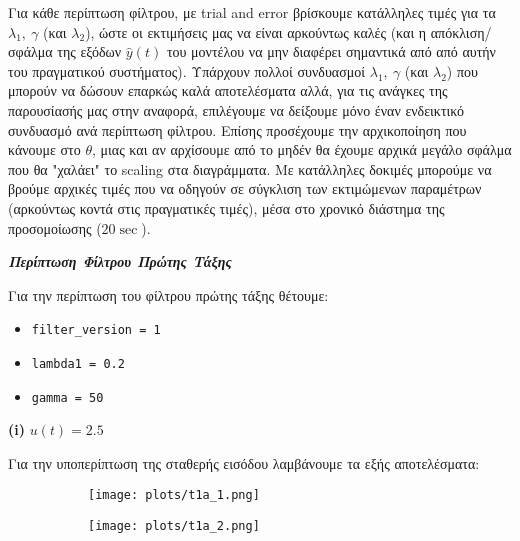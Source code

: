 \documentclass[12pt]{article} %
\numberwithin{equation}{section}  %
\begin{document}
Για κάθε περίπτωση φίλτρου, με trial and error βρίσκουμε κατάλληλες τιμές για τα $\lambda_1, \ \gamma$ (και $\lambda_2$), ώστε οι εκτιμήσεις μας να είναι αρκούντως καλές (και η απόκλιση/σφάλμα της εξόδων $\hat{y}(t)$ του μοντέλου να μην διαφέρει σημαντικά από από αυτήν του πραγματικού συστήματος). Υπάρχουν πολλοί συνδυασμοί $\lambda_1, \ \gamma$ (και $\lambda_2$) που μπορούν να δώσουν επαρκώς καλά αποτελέσματα αλλά, για τις ανάγκες της παρουσίασής μας στην αναφορά, επιλέγουμε να δείξουμε μόνο έναν ενδεικτικό συνδυασμό ανά περίπτωση φίλτρου. Επίσης προσέχουμε την αρχικοποίηση που κάνουμε στο $\theta$, μιας και αν αρχίσουμε από το μηδέν θα έχουμε αρχικά μεγάλο σφάλμα που θα "χαλάει" το scaling στα διαγράμματα. Με κατάλληλες δοκιμές μπορούμε να βρούμε αρχικές τιμές που να οδηγούν σε σύγκλιση των εκτιμώμενων παραμέτρων (αρκούντως κοντά στις πραγματικές τιμές), μέσα στο χρονικό διάστημα της προσομοίωσης ($20\sec$).

\vspace{+10pt}

\noindent\textit{\textbf{Περίπτωση Φίλτρου Πρώτης Τάξης}} 

Για την περίπτωση του φίλτρου πρώτης τάξης θέτουμε:
\begin{itemize}[noitemsep, nolistsep]
    \item \texttt{filter\_version = 1}
    \item \texttt{lambda1 = 0.2}
    \item \texttt{gamma = 50}
\end{itemize}

\begin{center}
    \textbf{(i)} $u(t) = 2.5$
\end{center}

\noindent Για την υποπερίπτωση της σταθερής εισόδου λαμβάνουμε τα εξής αποτελέσματα:

\begin{figure}[h!]
    \begin{subfigure}{0.45\textwidth}
        \centering
        \texttt{[image: plots/t1a\_1.png]}
        \caption{}
        \label{fig:t1a_1}
    \end{subfigure}
    \hfill
    \begin{subfigure}{0.45\textwidth}
        \centering
        \texttt{[image: plots/t1a\_2.png]}
        \caption{}
        \label{fig:t1a_2}
    \end{subfigure}

\end{figure}
\end{document}
